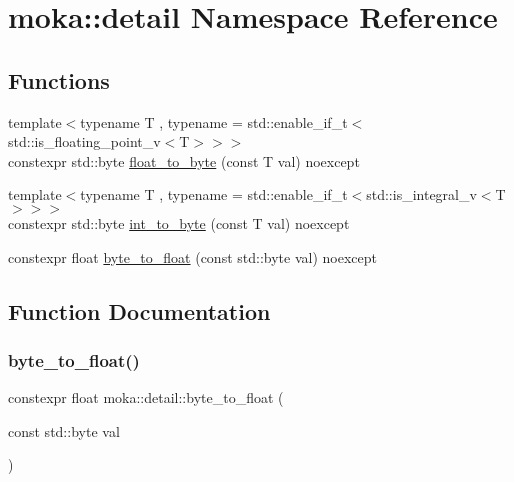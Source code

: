 \hypertarget{namespacemoka_1_1detail}{}\section{moka\+::detail Namespace Reference}
\label{namespacemoka_1_1detail}
\subsection*{Functions}
\begin{DoxyCompactItemize}
\item 
{\footnotesize template$<$typename T , typename  = std\+::enable\+\_\+if\+\_\+t$<$std\+::is\+\_\+floating\+\_\+point\+\_\+v$<$\+T$>$$>$$>$ }\\constexpr std\+::byte \mbox{\hyperlink{namespacemoka_1_1detail_ae7d7310f93779c41997daa340c988dd9}{float\+\_\+to\+\_\+byte}} (const T val) noexcept
\item 
{\footnotesize template$<$typename T , typename  = std\+::enable\+\_\+if\+\_\+t$<$std\+::is\+\_\+integral\+\_\+v$<$\+T$>$$>$$>$ }\\constexpr std\+::byte \mbox{\hyperlink{namespacemoka_1_1detail_a366b546068df519a1f4295fe4705d5a8}{int\+\_\+to\+\_\+byte}} (const T val) noexcept
\item 
constexpr float \mbox{\hyperlink{namespacemoka_1_1detail_a1bd78521b2ac8afefe45a70068c60004}{byte\+\_\+to\+\_\+float}} (const std\+::byte val) noexcept
\end{DoxyCompactItemize}


\subsection{Function Documentation}
\mbox{\label{namespacemoka_1_1detail_a1bd78521b2ac8afefe45a70068c60004}} 
\subsubsection{\texorpdfstring{byte\_to\_float()}{byte\_to\_float()}}
{\footnotesize\ttfamily constexpr float moka\+::detail\+::byte\+\_\+to\+\_\+float (\begin{DoxyParamCaption}\item[{const std\+::byte}]{val }\end{DoxyParamCaption})\hspace{0.3cm}{\ttfamily [noexcept]}}

